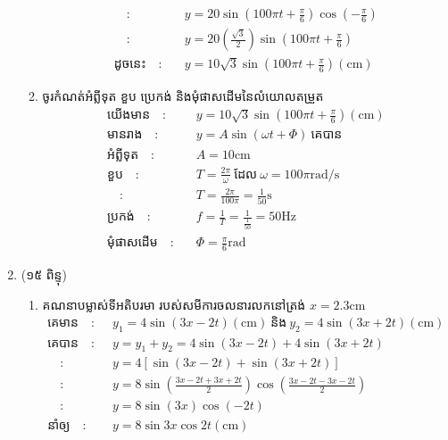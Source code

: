 \documentclass{classes/exam}
\begin{document}
\begin{enumerate}[I]
\begin{enumerate}[k]
\begin{align*}
			\quad :&\quad y=20\sin\left(100\pi t +\frac{\pi}{6}\right)\cos\left(-\frac{\pi}{6}\right)\\
			\quad :&\quad y=20\left(\frac{\sqrt{3}}{2}\right)\sin\left(100\pi t +\frac{\pi}{6}\right)\\
			\text{ដូចនេះ}\quad :&\quad y=10\sqrt{3}\sin\left(100\pi t +\frac{\pi}{6}\right)\left(\si{\centi\metre}\right)
		\end{align*}
		\item ចូរកំណត់អំព្លីទុត ខួប ប្រេកង់ និងមុំផាសដើមនៃលំយោលតម្រួត
		\begin{align*}
			\text{យើងមាន}\quad :&\quad y=10\sqrt{3}\sin\left(100\pi t +\frac{\pi}{6}\right)\left(\si{\centi\metre}\right)\\
			\text{មានរាង}\quad :&\quad y=A\sin\left(\omega t +\Phi\right)~\text{គេបាន}\\
			\text{អំព្លីទុត}\quad :&\quad A=10\si{\centi\metre}\\
			\text{ខួប}\quad :&\quad T=\frac{2\pi}{\omega}~\text{ដែល}~\omega=100\pi\si{\radian/\second}\\
			\quad :&\quad T=\frac{2\pi}{100\pi}=\frac{1}{50}\si{\second}\\
			\text{ប្រកង់}\quad :&\quad f=\frac{1}{T}=\frac{1}{\frac{1}{50}}=50\si{\hertz}\\
			\text{មុំផាសដើម}\quad :&\quad \Phi=\frac{\pi}{6}\si{\radian}
		\end{align*}
	\end{enumerate}
	\item {\color{magenta}\ks (១៥ ពិន្ទុ)}
	\begin{enumerate}[k]
		\item  គណនាបម្លាស់ទីអតិបរមា របស់សមីការចលនារលកនៅត្រង់ $x=2.3\si{\centi\metre}$
		\begin{align*}
			\text{គេមាន}\quad :&\quad y_{1}=4\sin\left(3x-2t\right)\left(\si{\centi\metre}\right)~\text{និង}~y_{2}=4\sin\left(3x+2t\right)\left(\si{\centi\metre}\right)\\
			\text{គេបាន}\quad :&\quad y=y_{1}+y_{2}=4\sin\left(3x-2t\right)+4\sin\left(3x+2t\right)\\
			\quad :&\quad y=4\left[\sin\left(3x-2t\right)+\sin\left(3x+2t\right)\right]\\
			\quad:&\quad
			y=8\sin\left(\frac{3x-2t+3x+2t}{2}\right)\cos\left(\frac{3x-2t-3x-2t}{2}\right)\\
			\quad :&\quad y=8\sin\left(3x\right)\cos\left(-2t\right)\\
			\text{នាំឲ្យ}\quad :&\quad y=8\sin 3x \cos 2t\left(\si{\centi\metre}\right)\\

\end{align*}
\end{enumerate}
\end{enumerate}
\end{document}
